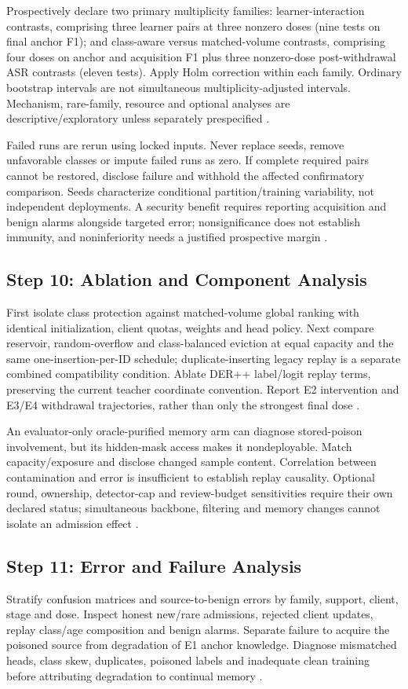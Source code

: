 \documentclass[10pt,a4paper]{article}
\begin{document}
Prospectively declare two primary multiplicity families: learner-interaction contrasts, comprising three learner pairs at three nonzero doses (nine tests on final anchor F1); and class-aware versus matched-volume contrasts, comprising four doses on anchor and acquisition F1 plus three nonzero-dose post-withdrawal ASR contrasts (eleven tests). Apply Holm correction within each family. Ordinary bootstrap intervals are not simultaneous multiplicity-adjusted intervals. Mechanism, rare-family, resource and optional analyses are descriptive/exploratory unless separately prespecified \cite{repo}.

Failed runs are rerun using locked inputs. Never replace seeds, remove unfavorable classes or impute failed runs as zero. If complete required pairs cannot be restored, disclose failure and withhold the affected confirmatory comparison. Seeds characterize conditional partition/training variability, not independent deployments. A security benefit requires reporting acquisition and benign alarms alongside targeted error; nonsignificance does not establish immunity, and noninferiority needs a justified prospective margin \cite{repo}.

\subsection{Step 10: Ablation and Component Analysis}
First isolate class protection against matched-volume global ranking with identical initialization, client quotas, weights and head policy. Next compare reservoir, random-overflow and class-balanced eviction at equal capacity and the same one-insertion-per-ID schedule; duplicate-inserting legacy replay is a separate combined compatibility condition. Ablate DER++ label/logit replay terms, preserving the current teacher coordinate convention. Report E2 intervention and E3/E4 withdrawal trajectories, rather than only the strongest final dose \cite{guo,cerasuolo,repo}.

An evaluator-only oracle-purified memory arm can diagnose stored-poison involvement, but its hidden-mask access makes it nondeployable. Match capacity/exposure and disclose changed sample content. Correlation between contamination and error is insufficient to establish replay causality. Optional round, ownership, detector-cap and review-budget sensitivities require their own declared status; simultaneous backbone, filtering and memory changes cannot isolate an admission effect \cite{repo}.

\subsection{Step 11: Error and Failure Analysis}
Stratify confusion matrices and source-to-benign errors by family, support, client, stage and dose. Inspect honest new/rare admissions, rejected client updates, replay class/age composition and benign alarms. Separate failure to acquire the poisoned source from degradation of E1 anchor knowledge. Diagnose mismatched heads, class skew, duplicates, poisoned labels and inadequate clean training before attributing degradation to continual memory \cite{carillo,lavaur,guo,repo}.
\end{document}
